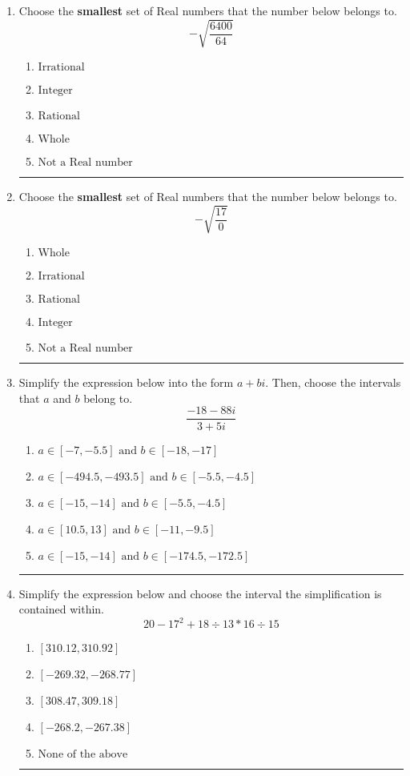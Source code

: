 \documentclass[14pt]{extbook}
\newcommand{\litem}[1]{\item#1\hspace*{-1cm}\rule{\textwidth}{0.4pt}}
\begin{document}
\begin{enumerate}
{\begin{enumerate}[label=\Alph*.]
\end{enumerate} }
\litem{
Choose the \textbf{smallest} set of Real numbers that the number below belongs to.\[ -\sqrt{\frac{6400}{64}} \]\begin{enumerate}[label=\Alph*.]
\item \( \text{Irrational} \)
\item \( \text{Integer} \)
\item \( \text{Rational} \)
\item \( \text{Whole} \)
\item \( \text{Not a Real number} \)

\end{enumerate} }
\litem{
Choose the \textbf{smallest} set of Real numbers that the number below belongs to.\[ -\sqrt{\frac{17}{0}} \]\begin{enumerate}[label=\Alph*.]
\item \( \text{Whole} \)
\item \( \text{Irrational} \)
\item \( \text{Rational} \)
\item \( \text{Integer} \)
\item \( \text{Not a Real number} \)

\end{enumerate} }
\litem{
Simplify the expression below into the form $a+bi$. Then, choose the intervals that $a$ and $b$ belong to.\[ \frac{-18 - 88 i}{3 + 5 i} \]\begin{enumerate}[label=\Alph*.]
\item \( a \in [-7, -5.5] \text{ and } b \in [-18, -17] \)
\item \( a \in [-494.5, -493.5] \text{ and } b \in [-5.5, -4.5] \)
\item \( a \in [-15, -14] \text{ and } b \in [-5.5, -4.5] \)
\item \( a \in [10.5, 13] \text{ and } b \in [-11, -9.5] \)
\item \( a \in [-15, -14] \text{ and } b \in [-174.5, -172.5] \)

\end{enumerate} }
\litem{
Simplify the expression below and choose the interval the simplification is contained within.\[ 20 - 17^2 + 18 \div 13 * 16 \div 15 \]\begin{enumerate}[label=\Alph*.]
\item \( [310.12, 310.92] \)
\item \( [-269.32, -268.77] \)
\item \( [308.47, 309.18] \)
\item \( [-268.2, -267.38] \)
\item \( \text{None of the above} \)


\end{enumerate}}
\end{enumerate}
\end{document}
